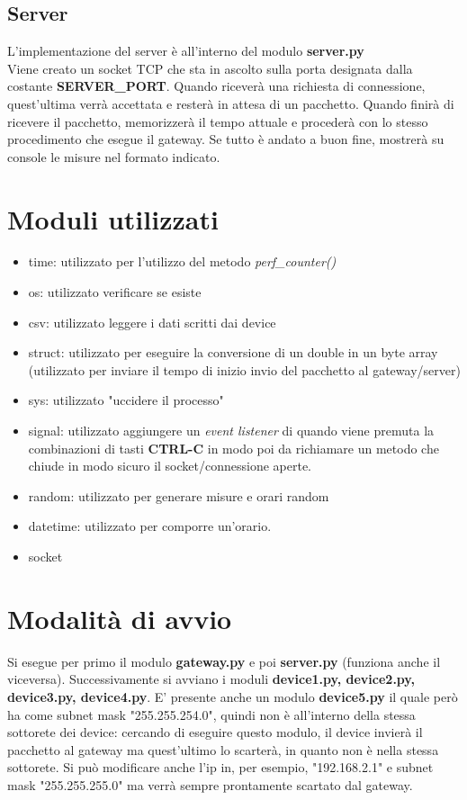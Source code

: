 \documentclass[a4paper, 14pt]{extreport}
\begin{document}
    \pagebreak

    \section{Server}
    L'implementazione del server è all'interno del modulo \textbf{server.py} \\
    Viene creato un socket TCP che sta in ascolto sulla porta designata dalla costante \textbf{SERVER\_PORT}.
    Quando riceverà una richiesta di connessione, quest'ultima verrà accettata e resterà in 
    attesa di un pacchetto. Quando finirà di ricevere il pacchetto, memorizzerà il tempo
    attuale e procederà con lo stesso procedimento che esegue il gateway.
    Se tutto è andato a buon fine, mostrerà su console le misure nel formato indicato.

    \pagebreak

    \chapter{Moduli utilizzati}
    \begin{itemize}
        \item time: utilizzato per l'utilizzo del metodo \emph{perf\_counter()} 
        \item os: utilizzato verificare se esiste 
        \item csv: utilizzato leggere i dati scritti dai device
        \item struct: utilizzato per eseguire la conversione di un double in un byte array 
                    (utilizzato per inviare il tempo di inizio invio del pacchetto al gateway/server)
        \item sys: utilizzato "uccidere il processo"
        \item signal: utilizzato aggiungere un \emph{event listener} di quando viene premuta
                    la combinazioni di tasti \textbf{CTRL-C} in modo poi da richiamare un metodo
                    che chiude in modo sicuro il socket/connessione aperte.
        \item random: utilizzato per generare misure e orari random
        \item datetime: utilizzato per comporre un'orario.
        \item socket
    \end{itemize}

    \chapter{Modalità di avvio}
    Si esegue per primo il modulo \textbf{gateway.py} e poi \textbf{server.py} 
    (funziona anche il viceversa).
    Successivamente si avviano i moduli \textbf{device1.py, device2.py, device3.py, device4.py}.
    E' presente anche un modulo \textbf{device5.py} il quale però ha come subnet mask
    "255.255.254.0", quindi non è all'interno della stessa sottorete dei device:
    cercando di eseguire questo modulo, il device invierà il pacchetto al gateway
    ma quest'ultimo lo scarterà, in quanto non è nella stessa sottorete.
    Si può modificare anche l'ip in, per esempio, "192.168.2.1" e subnet mask "255.255.255.0"
    ma verrà sempre prontamente scartato dal gateway.
\end{document}
